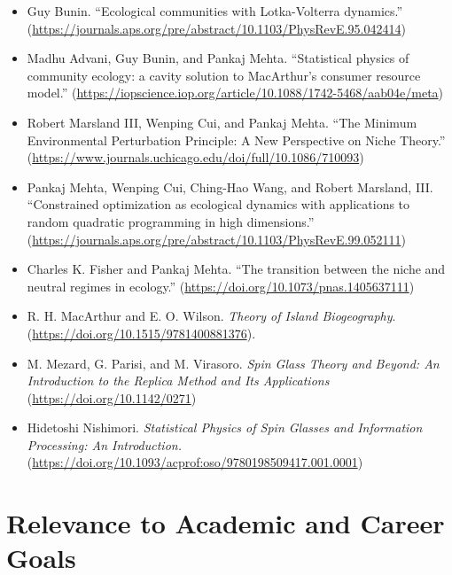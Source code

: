 \documentclass[letterpaper,12pt]{article}
\begin{document}
\begin{itemize}
    \item 
    {Guy Bunin.}
    ``Ecological communities with Lotka-Volterra dynamics.''
    (\url{https://journals.aps.org/pre/abstract/10.1103/PhysRevE.95.042414})
    \item 
    {Madhu Advani, Guy Bunin, and Pankaj Mehta.}
    ``Statistical physics of community ecology: a cavity solution to  MacArthur’s consumer resource model.''
    (\url{https://iopscience.iop.org/article/10.1088/1742-5468/aab04e/meta})
    \item {Robert Marsland III, Wenping Cui, and Pankaj Mehta.} ``The Minimum Environmental Perturbation Principle: A New Perspective on Niche Theory.''
    (\url{https://www.journals.uchicago.edu/doi/full/10.1086/710093})
    \item
    {Pankaj Mehta, Wenping Cui, Ching-Hao Wang, and Robert Marsland, III.}
    ``Constrained optimization as ecological dynamics with applications to random quadratic programming in high dimensions.''
    (\url{https://journals.aps.org/pre/abstract/10.1103/PhysRevE.99.052111})
    \item {Charles K. Fisher and Pankaj Mehta.} ``The transition between the niche and neutral regimes in ecology.'' (\url{https://doi.org/10.1073/pnas.1405637111})
    \item {R. H. MacArthur and E. O. Wilson.} 
    {\em Theory of Island Biogeography}. (\url{https://doi.org/10.1515/9781400881376}).
    \item {M. Mezard, G. Parisi, and M. Virasoro.} {\em Spin Glass Theory and Beyond: An Introduction to the Replica Method and Its Applications}
    (\url{https://doi.org/10.1142/0271})
    \item {Hidetoshi Nishimori.} {\em Statistical Physics of Spin Glasses and Information Processing: An Introduction.}
    (\url{https://doi.org/10.1093/acprof:oso/9780198509417.001.0001})
\end{itemize}
\newpage

\section*{Relevance to Academic and Career Goals}
\end{document}

